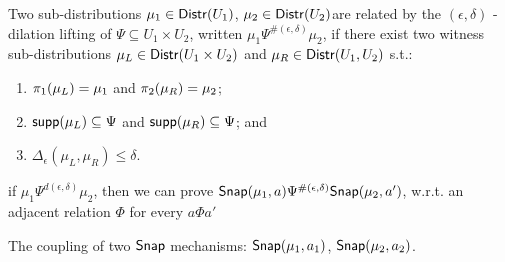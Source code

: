 \documentclass{article}
\begin{document}
\begin{defn}
Two sub-distributions $\mu_1 \in \mathsf{Distr}(U_1)$, $\mu_2 \in \mathsf{Distr}(U_2)$are related by the $(\epsilon, \delta)$ - dilation lifting of $\Psi \subseteq U_1 \times U_2$, written $\mu_1 \Psi^{\#(\epsilon, \delta)} \mu_2$, if there exist two witness sub-distributions $\mu_L \in \mathsf{Distr}(U_1 \times U_2)$ and $\mu_R \in \mathsf{Distr}(U_1, U_2)$ s.t.:
\begin{enumerate}
	\item $\pi_1(\mu_L) = \mu_1$ and $\pi_2(\mu_R) = \mu_2$;
	\item $\mathsf{supp}(\mu_L) \subseteq \Psi$ and $\mathsf{supp}(\mu_R) \subseteq \Psi$; and
	\item $\Delta_{\epsilon}(\mu_L, \mu_R) \leq \delta$.
\end{enumerate}
\end{defn}

\begin{thm}
if $\mu_1 \Psi^{d(\epsilon, \delta)} \mu_2$, then we can prove $\mathsf{Snap}(\mu_1, a) \Psi^{\#(\epsilon, \delta)}\mathsf{Snap}(\mu_2, a')$, w.r.t. an adjacent relation $\Phi$ for every $a \Phi a'$
\end{thm}

\begin{thm}
The coupling of two $\mathsf{Snap}$ mechanisms: $\mathsf{Snap}(\mu_1, a_1)$, $\mathsf{Snap}(\mu_2, a_2)$.
\end{thm}
\end{document}
